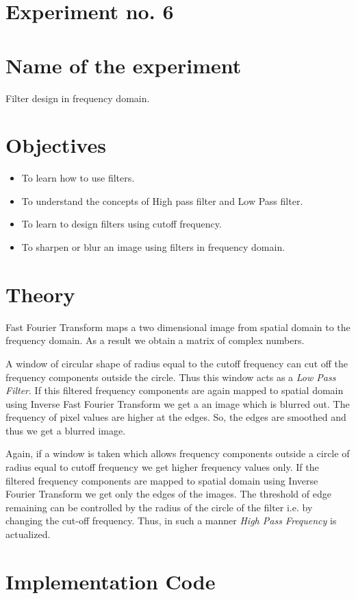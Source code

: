 \documentclass[a4paper,11pt]{article}
\begin{document}
	\section*{Experiment no. 6}
	\section*{Name of the experiment}
	Filter design in frequency domain.
	\section*{Objectives}
	\begin{itemize}
		\item To learn how to use filters. 
		\item To understand the concepts of High pass filter and Low Pass filter.
		\item To learn to design filters using cutoff frequency.
		\item To sharpen or blur an image using filters in frequency domain.
		
	\end{itemize}
	\section*{Theory}
	Fast Fourier Transform maps a two dimensional image from spatial domain to the frequency domain. As a result we obtain a matrix of complex numbers. 
	
	A window of circular shape of radius equal to the cutoff frequency can cut off the frequency components outside the circle. Thus this window acts as a \emph{Low Pass Filter}. If this filtered frequency components are again mapped to spatial domain using Inverse Fast Fourier Transform we get a an image which is blurred out. The frequency of pixel values are higher at the edges. So, the edges are smoothed and thus we get a blurred image.
	
	Again, if a window is taken which allows frequency components outside a circle of radius equal to cutoff frequency we get higher frequency values only. If the filtered frequency components are mapped to spatial domain using Inverse Fourier Transform we get only the edges of the images. The threshold of edge remaining can be controlled by the radius of the circle of the filter i.e. by changing the cut-off frequency. Thus, in such a manner \emph{High Pass Frequency} is actualized.
	
	
	\section*{Implementation Code}  
	\captionsetup{labelformat=empty,labelsep=none}
	
	\vspace*{8.7cm}
\end{document}
